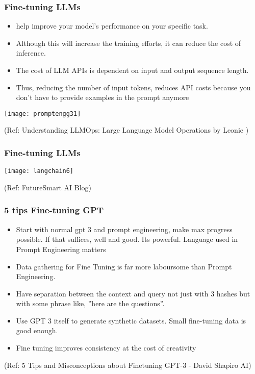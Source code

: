 \begin{frame}[fragile]\frametitle{Fine-tuning LLMs}

\begin{itemize}
\item help improve your model's performance on your specific task. 
\item Although this will increase the training efforts, it can reduce the cost of inference. 
\item The cost of LLM APIs is dependent on input and output sequence length. 
\item Thus, reducing the number of input tokens, reduces API costs because you don't have to provide examples in the prompt anymore
\end{itemize}	

\begin{center}
\texttt{[image: promptengg31]}
\end{center}		

{\tiny (Ref: Understanding LLMOps: Large Language Model Operations by Leonie )}

\end{frame}

\begin{frame}[fragile]\frametitle{Fine-tuning LLMs}

\begin{center}
\texttt{[image: langchain6]}

{\tiny (Ref: FutureSmart AI Blog)}

\end{center}		


\end{frame}

\begin{frame}[fragile]\frametitle{5 tips Fine-tuning GPT}

\begin{itemize}
\item Start with normal gpt 3 and prompt engineering, make max progress possible. If that suffices, well and good. Its powerful. Language used in Prompt Engineering matters
\item Data gathering for Fine Tuning is far more laboursome than Prompt Engineering.
\item Have separation between the context and query not just with 3 hashes but with some phrase like, ''here are the questions''.
\item Use GPT 3 itself to generate synthetic datasets. Small fine-tuning data is good enough.
\item Fine tuning improves consistency at the cost of creativity
\end{itemize}	

{\tiny (Ref: 5 Tips and Misconceptions about Finetuning GPT-3 - David Shapiro AI)}


\end{frame}



